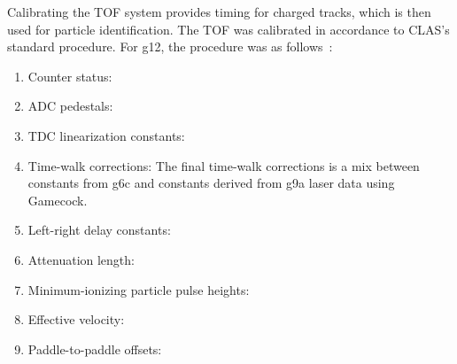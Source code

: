 Calibrating the TOF system provides timing for charged tracks, which is then used for particle identification. The TOF was calibrated in accordance to CLAS's standard procedure. For g12, the procedure was as follows~\cite{clas.thesis.bookwalter}: 
\begin{enumerate}
	\item Counter status: %
	\item ADC pedestals: %
	\item TDC linearization constants: %
	\item Time-walk corrections: %
	The final time-walk corrections is a mix between constants from g6c and constants derived from g9a laser data using Gamecock.
	\item Left-right delay constants: %
	\item Attenuation length: %
	\item Minimum-ionizing particle pulse heights: %
	\item Effective velocity: %
	\item Paddle-to-paddle offsets: %
\end{enumerate}


